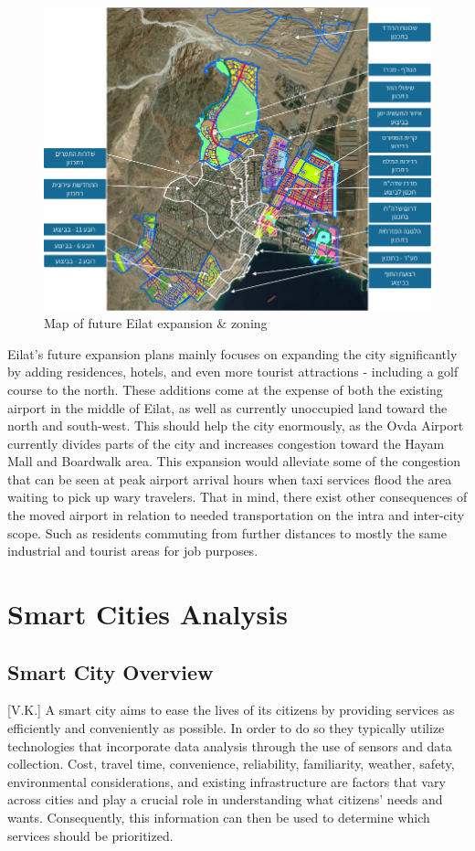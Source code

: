 \documentclass[12pt]{article}                       %
\begin{document}
\begin{figure}[H]
    \centering
    \includegraphics[width=12cm]{images/eilat_zoning_future.png}
    \caption{Map of future Eilat expansion \& zoning}
    \label{img:eilat_expansion}
\end{figure}

Eilat's future expansion plans mainly focuses on expanding the city significantly by adding residences, hotels, and even more tourist attractions - including a golf course to the north. These additions come at the expense of both the existing airport in the middle of Eilat, as well as currently unoccupied land toward the north and south-west. This should help the city enormously, as the Ovda Airport currently divides parts of the city and increases congestion toward the Hayam Mall and Boardwalk area.  This expansion would alleviate some of the congestion that can be seen at peak airport arrival hours when taxi services flood the area waiting to pick up wary travelers. That in mind, there exist other consequences of the moved airport in relation to needed transportation on the intra and inter-city scope. Such as residents commuting from further distances to mostly the same industrial and tourist areas for job purposes. 

\newpage
\section{Smart Cities Analysis}
\subsection{Smart City Overview}[V.K.]
A smart city aims to ease the lives of its citizens by providing services as efficiently and conveniently as possible. In order to do so they typically utilize technologies that incorporate data analysis through the use of sensors and data collection. Cost, travel time, convenience, reliability, familiarity, weather, safety, environmental considerations, and existing infrastructure are factors that vary across cities and play a crucial role in understanding what citizens' needs and wants. Consequently, this information can then be used to determine which services should be prioritized. 
\end{document}
